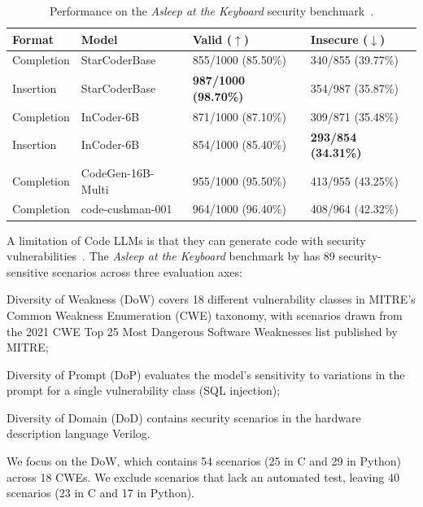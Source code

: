 \documentclass[10pt]{article} %
\begin{document}
\begin{table}[t]
\centering
\begin{tabular}{llll}
\toprule
 \textbf{Format}     & \textbf{Model}             & \textbf{Valid ($\uparrow$)}             & \textbf{Insecure ($\downarrow$)}         \\
\midrule
 Completion & StarCoderBase         & 855/1000 (85.50\%) & 340/855 (39.77\%) \\
 Insertion  & StarCoderBase         & \textbf{987/1000 (98.70\%)} & 354/987 (35.87\%) \\
 Completion & InCoder-6B        & 871/1000 (87.10\%) & 309/871 (35.48\%) \\
 Insertion  & InCoder-6B        & 854/1000 (85.40\%) & \textbf{293/854 (34.31\%)} \\
 Completion & CodeGen-16B-Multi & 955/1000 (95.50\%) & 413/955 (43.25\%) \\
 Completion & code-cushman-001  & 964/1000 (96.40\%) & 408/964 (42.32\%) \\
\bottomrule
\end{tabular}
\caption{Performance on the \emph{Asleep at the Keyboard} security benchmark~\citep{pearce2022copilotsec}.} 
\label{tab:asleep_sec_benchmark}
\end{table}

A limitation of Code LLMs is that they can generate code with security vulnerabilities~\citep{pearce2022copilotsec}.
The \emph{Asleep at the Keyboard} benchmark by \citet{pearce2022copilotsec} has 89 security-sensitive scenarios across three evaluation axes: 
\begin{inparaenum}[(1)]
\item Diversity of Weakness (DoW) covers 18 different vulnerability classes in MITRE's Common Weakness Enumeration (CWE) taxonomy, with scenarios drawn from the 2021 CWE Top 25 Most Dangerous Software Weaknesses list published by MITRE;
\item Diversity of Prompt (DoP) evaluates the model's sensitivity to variations in the prompt for a single vulnerability class (SQL injection);
\item Diversity of Domain (DoD) contains security scenarios in the hardware description language Verilog. 
\end{inparaenum}
We focus on the DoW, which contains 54 scenarios (25 in C and 29 in Python) across 18 CWEs. We exclude scenarios that lack an automated test, leaving 40 scenarios (23 in C and 17 in Python).
\end{document}
